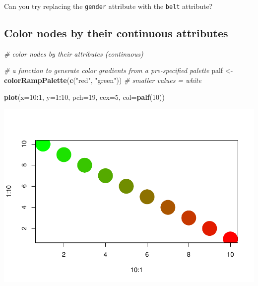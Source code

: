 \documentclass[
]{book}
\newenvironment{Shaded}{\begin{snugshade}}{\end{snugshade}}
\newcommand{\AttributeTok}[1]{\textcolor[rgb]{0.13,0.29,0.53}{#1}}
\newcommand{\CommentTok}[1]{\textcolor[rgb]{0.56,0.35,0.01}{\textit{#1}}}
\newcommand{\DecValTok}[1]{\textcolor[rgb]{0.00,0.00,0.81}{#1}}
\newcommand{\FunctionTok}[1]{\textcolor[rgb]{0.13,0.29,0.53}{\textbf{#1}}}
\newcommand{\NormalTok}[1]{#1}
\newcommand{\OtherTok}[1]{\textcolor[rgb]{0.56,0.35,0.01}{#1}}
\newcommand{\SpecialCharTok}[1]{\textcolor[rgb]{0.81,0.36,0.00}{\textbf{#1}}}
\newcommand{\StringTok}[1]{\textcolor[rgb]{0.31,0.60,0.02}{#1}}
\begin{document}
Can you try replacing the \texttt{gender} attribute with the \texttt{belt} attribute?

\subsection{Color nodes by their continuous attributes}\label{color-nodes-by-their-continuous-attributes}

\begin{Shaded}
\begin{Highlighting}[]
\CommentTok{\# color nodes by their attributes (continuous) }

\CommentTok{\# a function to generate color gradients from a pre{-}specified palette }
\NormalTok{palf }\OtherTok{\textless{}{-}} \FunctionTok{colorRampPalette}\NormalTok{(}\FunctionTok{c}\NormalTok{(}\StringTok{"red"}\NormalTok{, }\StringTok{"green"}\NormalTok{)) }\CommentTok{\# smaller values = white }

\FunctionTok{plot}\NormalTok{(}\AttributeTok{x=}\DecValTok{10}\SpecialCharTok{:}\DecValTok{1}\NormalTok{, }\AttributeTok{y=}\DecValTok{1}\SpecialCharTok{:}\DecValTok{10}\NormalTok{, }\AttributeTok{pch=}\DecValTok{19}\NormalTok{, }\AttributeTok{cex=}\DecValTok{5}\NormalTok{, }\AttributeTok{col=}\FunctionTok{palf}\NormalTok{(}\DecValTok{10}\NormalTok{))}
\end{Highlighting}
\end{Shaded}

\includegraphics{bookdown-demo_files/figure-latex/unnamed-chunk-179-1.pdf}

\begin{Shaded}
\end{Shaded}
\end{document}
